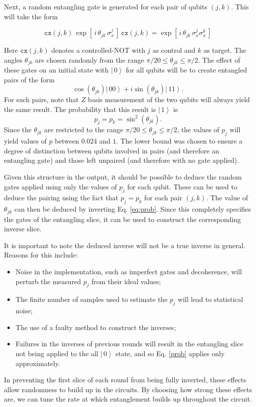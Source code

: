 \documentclass[aps,prl,twocolumn,showpacs,preprintnumbers]{revtex4-1}
\newcommand{\be}{\begin{equation}}
\newcommand{\ee}{\end{equation}}
\newcommand{\ket}[1]{\left | \, #1 \right\rangle}
\begin{document}
Next, a random entangling gate is generated for each pair of qubits $(j,k)$. This will take the form

\be
\mathtt{cx} (j,k) \, \exp [ \, i \, \theta_{jk} \, \sigma^j_x \, ] \, \mathtt{cx}(j,k) = \exp [ \, i \, \theta_{jk} \, \sigma^j_x \sigma^k_x \, ]
\ee

Here $\mathtt{cx}(j,k)$ denotes a controlled-NOT with $j$ as control and $k$ as target. The angles $\theta_{jk}$ are chosen randomly from the range $\pi/20 \leq \theta_{jk} \leq \pi/2$. The effect of these gates on an initial state with $\ket{0}$ for all qubits will be to create entangled pairs of the form
\be \label{state}
\cos (\theta_{jk}) \ket{00} + i \sin (\theta_{jk}) \ket{11} .
\ee
For such pairs, note that $Z$ basis measurement of the two qubits will always yield the same result. The probability that this result is $\ket{1}$ is
\be \label{eq:prob}
p_j = p_k = \sin^2 (\theta_{jk}).
\ee
Since the $\theta_{jk}$ are restricted to the range $\pi/20 \leq \theta_{jk} \leq \pi/2$, the values of $p_j$ will yield values of $p$ between $0.024$ and $1$. The lower bound was chosen to ensure a degree of distinction between qubits involved in pairs (and therefore an entangling gate) and those left unpaired (and therefore with no gate applied).

Given this structure in the output, it should be possible to deduce the random gates applied using only the values of $p_j$ for each qubit. These can be used to deduce the pairing using the fact that $p_j=p_k$ for each pair $(j,k)$. The value of $\theta_{jk}$ can then be deduced by inverting Eq. \ref{eq:prob}. Since this completely specifies the gates of the entangling slice, it can be used to construct the corresponding inverse slice.

It is important to note the deduced inverse will not be a true inverse in general. Reasons for this include:
\begin{itemize}
\item Noise in the implementation, such as imperfect gates and decoherence, will perturb the measured $p_j$ from their ideal values;
\item The finite number of samples used to estimate the $p_j$ will lead to statistical noise;
\item The use of a faulty method to construct the inverses;
\item Failures in the inverses of previous rounds will result in the entangling slice not being applied to the all $\ket{0}$ state, and so Eq. \ref{prob} applies only approximately.
\end{itemize}
In preventing the first slice of each round from being fully inverted, these effects allow randomness to build up in the circuits. By choosing how strong these effects are, we can tune the rate at which entanglement builds up throughout the circuit.
\end{document}
